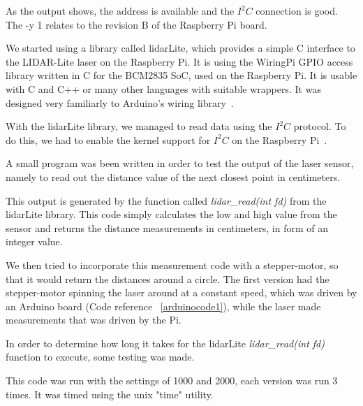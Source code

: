 As the output shows, the address is available and the $I^2C$ connection is good. The -y 1 relates to the revision B of the Raspberry Pi board.

We started using a library called lidarLite, which provides a simple C interface to the LIDAR-Lite laser on the Raspberry Pi. It is using the WiringPi GPIO access library written in C for the BCM2835 SoC, used on the Raspberry Pi. It is usable with C and C++ or many other languages with suitable wrappers. It was designed very familiarly to Arduino's wiring library~\cite{wiringPi-similarities}.

With the lidarLite library\cite{lidarlib}, we managed to read data using the $I^2C$ protocol. To do this, we had to enable the kernel support for $I^2C$ on the Raspberry Pi~\cite{i2csetup}.

A small program was been written in order to test the output of the laser sensor, namely to read out the distance value of the next closest point in centimeters. 



This output is generated by the function called \textit{lidar\_read(int fd)} from the lidarLite library. This code simply calculates the low and high value from the sensor and returns the distance measurements in centimeters, in form of an integer value.

\clearpage



We then tried to incorporate this measurement code with a stepper-motor, so that it would return the distances around a circle. The first version had the stepper-motor spinning the laser around at a constant speed, which was driven by an Arduino board (Code reference ~\ref{arduinocode1}), while the laser made measurements that was driven by the Pi.

In order to determine how long it takes for the lidarLite \textit{lidar\_read(int fd)} function to execute, some testing was made.



This code was run with the settings of 1000 and 2000, each version was run 3 times. It was timed using the unix "time" utility.

